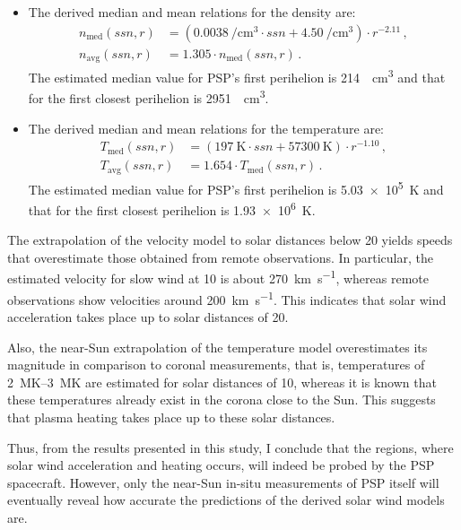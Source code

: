 \begin{itemize}
	\item The derived median and mean relations for the density are:
	\begin{align*}
		n_\text{med}(ssn,r) &= \left(\SI{0.0038}{\per\cm\cubed} \cdot ssn + \SI{4.50}{\per\cm\cubed}\right) \cdot r^{-2.11}	\,,\\
		n_\text{avg}(ssn,r) &= 1.305 \cdot n_\text{med}(ssn,r)	\,.
	\end{align*}
	 The estimated median value for PSP's first perihelion is \SI{214}{\per\cm\cubed} and that for the first closest perihelion is \SI{2951}{\per\cm\cubed}.
	
	\item The derived median and mean relations for the temperature are:
	\begin{align*}
		T_\text{med}(ssn,r) &= (\SI{197}{\K} \cdot ssn + \SI{57300}{\K}) \cdot r^{-1.10}	\,,\\
		T_\text{avg}(ssn,r) &= 1.654 \cdot T_\text{med}(ssn,r)\,.
	\end{align*}
	 The estimated median value for PSP's first perihelion is \SI{5.03e5}{\kelvin} and that for the first closest perihelion is \SI{1.93e6}{\kelvin}.
\end{itemize}

\bigskip

The extrapolation of the velocity model to solar distances below \SI{20}{\Rs} yields speeds that overestimate those obtained from remote observations. In particular, the estimated velocity for slow wind at \SI{10}{\Rs} is about \SI{270}{\km\per\s}, whereas remote observations show velocities around \SI{200}{\km\per\s}. This indicates that solar wind acceleration takes place up to solar distances of \SI{20}{\Rs}.

Also, the near-Sun extrapolation of the temperature model overestimates its magnitude in comparison to coronal measurements, that is, temperatures of \SIrange{2}{3}{\mega\kelvin} are estimated for solar distances of \SI{10}{\Rs}, whereas it is known that these temperatures already exist in the corona close to the Sun. This suggests that plasma heating takes place up to these solar distances.

Thus, from the results presented in this study, I conclude that the regions, where solar wind acceleration and heating occurs, will indeed be probed by the PSP spacecraft. However, only the near-Sun in-situ measurements of PSP itself will eventually reveal how accurate the predictions of the derived solar wind models are.

